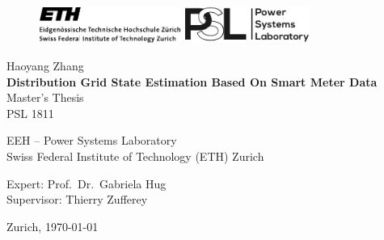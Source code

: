\begin{titlepage}
\begin{center}

\begin{figure}[!ht]
\includegraphics[height=12mm]{figures/include/eth_logo}
\hfill
\includegraphics[height=12mm]{figures/include/psl_logo}
\end{figure}

\vspace{22mm} Haoyang Zhang\\
\vspace{10mm} \textbf{\LARGE Distribution Grid State Estimation Based On Smart Meter Data} \\
\vspace{10mm} Master's Thesis \\ PSL 1811

\vfill

EEH -- Power Systems Laboratory \\ Swiss Federal Institute of Technology (ETH) Zurich \\

\vspace{5mm}

Expert: Prof.~Dr.~Gabriela Hug \\
Supervisor: Thierry Zufferey 

\vspace{5mm} Zurich, \today

\end{center}
\end{titlepage}
